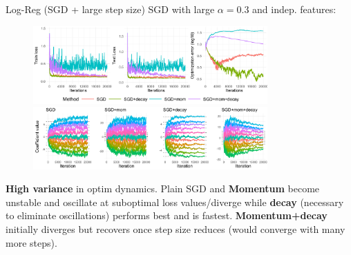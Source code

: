 \documentclass[11pt,compress,t,notes=noshow, xcolor=table]{beamer}
\begin{document}
\begin{vbframe}{Log-Reg (SGD + large step size)}
\vspace{-0.4cm}
SGD with large $\alpha=0.3$ and indep. features:
\begin{figure}
            \includegraphics[width=0.8\textwidth]{slides/04-multivariate-first-order/figure_man/simu_linmod/SGD_log_large_lr_iters.pdf} \\
             \includegraphics[width=0.8\textwidth]{slides/04-multivariate-first-order/figure_man/simu_linmod/SGD_log_coef_large.pdf}\\
            \begin{footnotesize}
            \end{footnotesize}
\end{figure}
\vspace{-0.2cm}
{\footnotesize
\textbf{High variance} in optim dynamics. Plain SGD and \textbf{Momentum} become unstable and oscillate at suboptimal loss values/diverge while \textbf{decay} (necessary to eliminate oscillations) performs best and is fastest. \textbf{Momentum+decay} initially diverges but recovers once step size reduces (would converge with many more steps).}
\end{vbframe}

\end{document}
